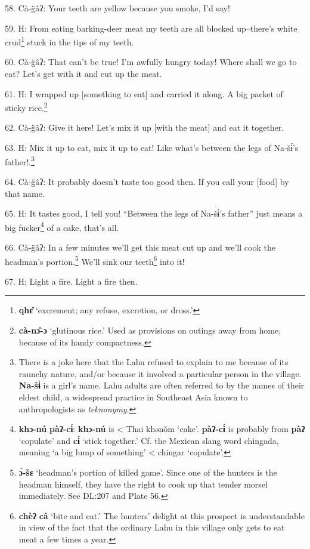 58. Cà-g̈âʔ: Your teeth are yellow because you smoke, I'd say!

59. H: From eating barking-deer meat my teeth are all blocked up--there's white
crud\footnote{\textbf{qhɛ̂} `excrement; any refuse, excretion, or dross.'} stuck in the tips of my teeth.

60. Cà-g̈âʔ: That can't be true! I'm awfully hungry today! Where shall we go
to eat? Let's get with it and cut up the meat.

61. H: I wrapped up [something to eat] and carried it along. A big packet of sticky
rice.\footnote{\textbf{cà-nɔ̂-ɔ} `glutinous rice.' Used as provisions on outings away from home, because of its handy compactness.}

62. Cà-g̈âʔ: Give it here! Let's mix it up [with the meat] and eat it together.

63. H: Mix it up to eat, mix it up to eat! Like what's between the legs of Na-šɨ́'s
father!.\footnote{There is a joke here that the Lahu refused to explain to me because of its raunchy nature, and/or because it involved a particular person in the village. \textbf{Na-šɨ́} is a girl's name. Lahu adults are often referred to by the names of their eldest child, a widespread practice in Southeast Asia known to anthropologists as \textit{teknonymy}.}


64. Cà-g̈âʔ: It probably doesn't taste too good then. If you call your [food]
by that name.

65. H: It tastes good, I tell you! ``Between the legs of Na-šɨ́'s father''
just means a big fucker\footnote{\textbf{khɔ-nú} \textbf{pàʔ-cɨ́}: \textbf{khɔ-nú} is < Thai khənǒm `cake'. \textbf{pàʔ-cɨ́} is probably from \textbf{pàʔ} `copulate' and \textbf{cɨ́} `stick together.' Cf. the Mexican slang word chingada, meaning `a big lump of something' < chingar `copulate'.} of a cake, that's all.

66. Cà-g̈âʔ: In a few minutes we'll get this meat cut up and we'll cook the
headman's portion.\footnote{\textbf{ɔ̀-šɛ} `headman's portion of killed game'. Since one of the hunters is the headman himself, they have the right to cook up that tender morsel immediately. See DL:207 and Plate 56.} We'll sink our teeth\footnote{\textbf{chèʔ} \textbf{câ} `bite and eat.' The hunters' delight at this prospect is understandable in view of the fact that the ordinary Lahu in this village only gets to eat meat a few times a year.} into it!

67. H; Light a fire. Light a fire then.

